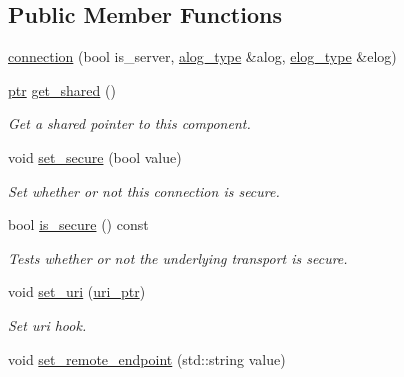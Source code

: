 \subsection*{Public Member Functions}
\begin{DoxyCompactItemize}
\item 
\hyperlink{classwebsocketpp_1_1transport_1_1stub_1_1connection_afaa38053f4adde031a537274f5826dbb}{connection} (bool is\+\_\+server, \hyperlink{classwebsocketpp_1_1transport_1_1stub_1_1connection_ab3b726566d87b32c0ea2fac987a12881}{alog\+\_\+type} \&alog, \hyperlink{classwebsocketpp_1_1transport_1_1stub_1_1connection_a24a76b753919af96513f67b3e51f7ecd}{elog\+\_\+type} \&elog)
\item 
\hyperlink{classwebsocketpp_1_1transport_1_1stub_1_1connection_aeb856d2a6734d303e13bed57c3d1081b}{ptr} \hyperlink{classwebsocketpp_1_1transport_1_1stub_1_1connection_a57eaed224b575c038d15fe0e48523e9f}{get\+\_\+shared} ()
\begin{DoxyCompactList}\small\item\em Get a shared pointer to this component. \end{DoxyCompactList}\item 
void \hyperlink{classwebsocketpp_1_1transport_1_1stub_1_1connection_afc1b6434bfe02d2efcda9e2887af83c4}{set\+\_\+secure} (bool value)
\begin{DoxyCompactList}\small\item\em Set whether or not this connection is secure. \end{DoxyCompactList}\item 
bool \hyperlink{classwebsocketpp_1_1transport_1_1stub_1_1connection_ad70380193f2193de5fa4c49f9184e5d6}{is\+\_\+secure} () const 
\begin{DoxyCompactList}\small\item\em Tests whether or not the underlying transport is secure. \end{DoxyCompactList}\item 
void \hyperlink{classwebsocketpp_1_1transport_1_1stub_1_1connection_ae542c0f0813c3943f8cf9739ead09961}{set\+\_\+uri} (\hyperlink{namespacewebsocketpp_aae370ea5ac83a8ece7712cb39fc23f5b}{uri\+\_\+ptr})
\begin{DoxyCompactList}\small\item\em Set uri hook. \end{DoxyCompactList}\item 
void \hyperlink{classwebsocketpp_1_1transport_1_1stub_1_1connection_a33b09a9683c924a15bb536613c4685c9}{set\+\_\+remote\+\_\+endpoint} (std\+::string value)

\end{DoxyCompactItemize}
